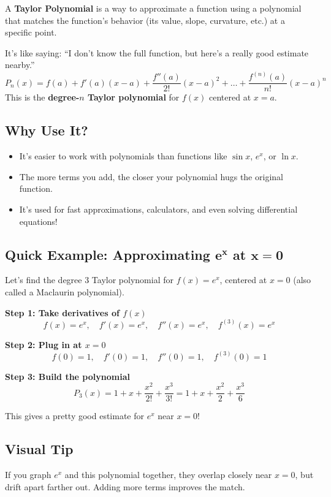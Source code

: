 \documentclass{article}
\begin{document}
\begin{tcolorbox}[colback=gray!8,colframe=black,title=Big-Idea: Polynomial Stand-Ins!]
A \textbf{Taylor Polynomial} is a way to approximate a function using a polynomial that matches the function's behavior (its value, slope, curvature, etc.) at a specific point.

It’s like saying: “I don’t know the full function, but here’s a really good estimate nearby.”
\[
P_n(x) = f(a) + f'(a)(x-a) + \frac{f''(a)}{2!}(x-a)^2 + \dots + \frac{f^{(n)}(a)}{n!}(x-a)^n
\]
This is the \textbf{degree-$n$ Taylor polynomial} for \(f(x)\) centered at \(x = a\).
\end{tcolorbox}

\subsection*{Why Use It?}
\begin{itemize}
  \item It’s easier to work with polynomials than functions like \(\sin x\), \(e^x\), or \(\ln x\).
  \item The more terms you add, the closer your polynomial hugs the original function.
  \item It’s used for fast approximations, calculators, and even solving differential equations!
\end{itemize}

\subsection*{Quick Example: Approximating \(\boldsymbol{e^x}\) at \(\boldsymbol{x = 0}\)}

Let’s find the degree 3 Taylor polynomial for \(f(x) = e^x\), centered at \(x = 0\) (also called a Maclaurin polynomial).

\textbf{Step 1: Take derivatives of \(f(x)\)}
\[
f(x) = e^x,\quad f'(x) = e^x,\quad f''(x) = e^x,\quad f^{(3)}(x) = e^x
\]

\textbf{Step 2: Plug in at \(x = 0\)}
\[
f(0) = 1,\quad f'(0) = 1,\quad f''(0) = 1,\quad f^{(3)}(0) = 1
\]

\textbf{Step 3: Build the polynomial}
\[
P_3(x) = 1 + x + \frac{x^2}{2!} + \frac{x^3}{3!}
= 1 + x + \frac{x^2}{2} + \frac{x^3}{6}
\]

This gives a pretty good estimate for \(e^x\) near \(x = 0\)!

\subsection*{Visual Tip}
If you graph \(e^x\) and this polynomial together, they overlap closely near \(x = 0\), but drift apart farther out. Adding more terms improves the match.
\end{document}
